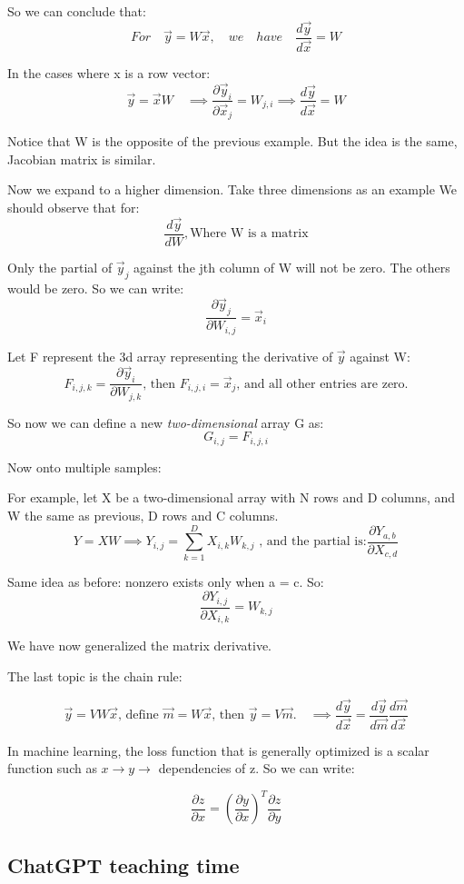 \documentclass[letterpaper,12pt]{article}
\begin{document}
So we can conclude that:
\[
    For \quad \vec{y}=W\vec{x},\quad we\quad have \quad \frac{d\vec{y}}{d\vec{x}} = W
\]

In the cases where x is a row vector:
\[
    \vec{y}=\vec{x}W\quad \implies     \frac{\partial \vec{y}_i}{\partial \vec{x}_j} = W_{j,i} \implies \frac{d\vec{y}}{d\vec{x}} = W
\]

Notice that W is the opposite of the previous example. But the idea is the
same, Jacobian matrix is similar.

Now we expand to a higher dimension. Take three dimensions as an example We
should observe that for:
\[\frac{d\vec{y}}{dW},\text{Where W is a matrix}\]

Only the partial of $\vec{y}_j$ against the jth column of W will not be zero.
The others would be zero. So we can write:
\[\frac{\partial\vec{y}_j}{\partial W_{i,j}}=\vec{x}_i\]

Let F represent the 3d array representing the derivative of $\vec{y}$ against
W:
\[
    F_{i,j,k}= \frac{\partial\vec{y}_i}{\partial W_{j,k}}\text{, then } F_{i,j,i}=\vec{x}_j\text{, and all other entries are zero.}
\]

So now we can define a new \textit{two-dimensional} array G as:
\[G_{i,j}=F_{i,j,i}\]

Now onto multiple samples:

For example, let X be a two-dimensional array with N rows and D columns, and W
the same as previous, D rows and C columns.
\[Y=XW \implies Y_{i,j}=\sum_{k=1}^{D}X_{i,k}W_{k,j}\text{ , and the partial is:} \frac{\partial Y_{a,b}}{\partial X_{c,d}}\]

Same idea as before: nonzero exists only when a = c. So:
\[
    \frac{\partial Y_{i,j}}{\partial X_{i,k}} = W_{k,j}
\]

We have now generalized the matrix derivative.

The last topic is the chain rule:

\[
    \vec{y}=VW\vec{x}\text{, define }\vec{m}=W\vec{x}\text{, then }\vec{y}=V\vec{m}.\quad \implies \frac{d\vec{y}}{d\vec{x}}= \frac{d\vec{y}}{d\vec{m}}\frac{d\vec{m}}{d\vec{x}}
\]

In machine learning, the loss function that is generally optimized is a scalar
function such as $x\rightarrow y \rightarrow $ dependencies of z. So we can
write:

\[\frac{\partial z}{\partial x} = {(\frac{\partial y}{\partial x})}^T \frac{\partial z}{\partial y}\]

\subsection{ChatGPT teaching time}
\end{document}
